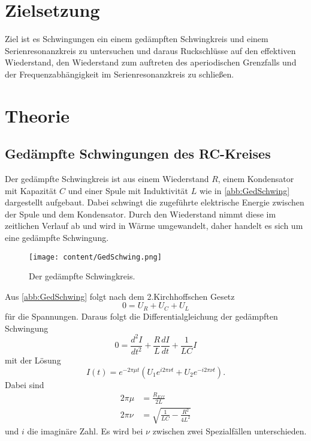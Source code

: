 \section{Zielsetzung}
\label{sec:Zielsetzung}
Ziel ist es Schwingungen ein einem gedämpften Schwingkreis und einem Serienresonanzkreis zu untersuchen und daraus
Ruckschlüsse auf den effektiven Wiederstand, den Wiederstand zum auftreten des aperiodischen Grenzfalls und der Frequenzabhängigkeit
im Serienresonanzkreis zu schließen.
\section{Theorie}
\label{sec:Theorie}
\subsection{Gedämpfte Schwingungen des RC-Kreises}
Der gedämpfte Schwingkreis ist aus einem Wiederstand $R$, einem Kondensator mit Kapazität $C$ und
einer Spule mit Induktivität $L$ wie in \autoref{abb:GedSchwing} dargestellt aufgebaut. Dabei schwingt
die zugeführte elektrische Energie zwischen der Spule und dem Kondensator. Durch den Wiederstand nimmt diese im zeitlichen
Verlauf ab und wird in Wärme umgewandelt, daher handelt es sich um eine gedämpfte Schwingung.
\begin{figure}[H]
    \centering
    \texttt{[image: content/GedSchwing.png]}
    \caption{Der gedämpfte Schwingkreis. \cite{sample}}
    \label{abb:GedSchwing}
\end{figure}
\noindent Aus \autoref{abb:GedSchwing} folgt nach dem 2.Kirchhoffschen Gesetz
\begin{equation*}
    0 = U_R + U_C + U_L
\end{equation*}
für die Spannungen.
Daraus folgt die Differentialgleichung der gedämpften Schwingung
\begin{equation*}
    0 = \frac{d^2 I}{dt^2} + \frac{R}{L}\frac{dI}{dt} + \frac{1}{LC}I
\end{equation*}
mit der Lösung
\begin{equation}
    \label{eqn:AllgLoes}
    I(t) = e^{-2\pi\mu t}\left(U_1e^{i2\pi\nu t} + U_2e^{-i2\pi\nu t}\right).
\end{equation}
Dabei sind
\begin{align}
   2\pi\mu &= \frac{R_{Eff}}{2L} \label{eqn:mu}\\
   2\pi\nu &= \sqrt{\frac{1}{LC} - \frac{R^2}{4L^2}}
\end{align}
und $i$ die imaginäre Zahl.
Es wird bei $\nu$ zwischen zwei Spezialfällen unterschieden.\\
